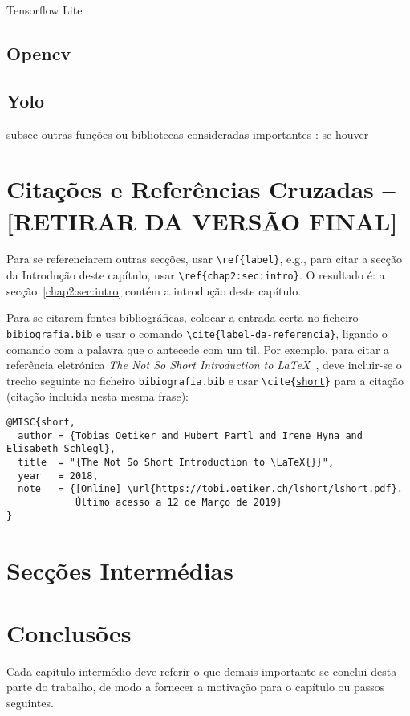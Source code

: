 Tensorflow Lite


\subsection{Opencv}
\label{chap2:subsec:opencv}



\subsection{Yolo}
\label{chap2:subsec:yolo}


subsec outras funções ou bibliotecas consideradas importantes : se houver







\section{Citações e Referências Cruzadas -- [RETIRAR DA VERSÃO FINAL]}
\label{chap2:sec:citacoes}

Para se referenciarem outras secções, usar \texttt{\textbackslash{}ref\{label\}}, e.g., para citar a secção da Introdução deste capítulo, usar \texttt{\textbackslash{}ref\{chap2:sec:intro\}}. O resultado é: a secção~\ref{chap2:sec:intro} contém a introdução deste capítulo.

Para se citarem fontes bibliográficas, \underline{colocar a entrada certa} no ficheiro \texttt{bibiografia.bib} e usar o comando \texttt{\textbackslash{}cite\{label-da-referencia\}}, ligando o comando com a palavra que o antecede com um til. Por exemplo, para citar a referência eletrónica \emph{The Not So Short Introduction to \LaTeX{}}~\cite{short}, deve incluir-se o trecho seguinte no ficheiro \texttt{bibiografia.bib} e usar \texttt{\textbackslash{}cite\{\underline{short}\}} para a citação (citação incluída nesta mesma frase):
%
\begin{verbatim}
@MISC{short,
  author = {Tobias Oetiker and Hubert Partl and Irene Hyna and Elisabeth Schlegl},
  title  = "{The Not So Short Introduction to \LaTeX{}}",
  year   = 2018,
  note   = {[Online] \url{https://tobi.oetiker.ch/lshort/lshort.pdf}. 
            Último acesso a 12 de Março de 2019}
}
\end{verbatim}


\section{Secções Intermédias}
\label{chap2:sec:...}

\section{Conclusões}
\label{chap2:sec:concs}

Cada capítulo \underline{intermédio} deve referir o que demais importante se conclui desta parte do trabalho, de modo a fornecer a motivação para o capítulo ou passos seguintes.
